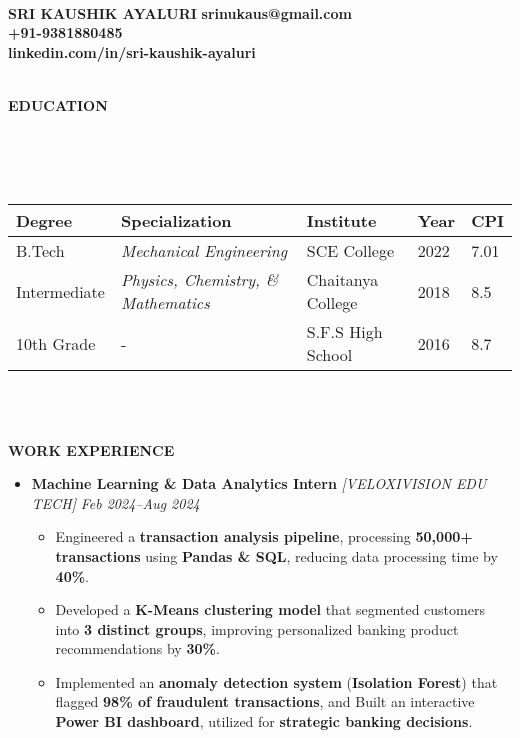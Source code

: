 \documentclass[a4paper,10pt]{article}
\newcommand{\lsep}{-0.5cm}
\newcommand{\resheading}[1]{%
  \par\noindent%
  \small%
  \colorbox{mygrey}{%
    \parbox{\dimexpr\linewidth-2\fboxsep\relax}{%
      \textbf{#1}%
    }%
  }%
  \par\nobreak%
}
\begin{document}
\hspace{0.5cm}\\[-1.8cm]

\textbf{SRI KAUSHIK AYALURI} \hspace{9.6cm} {\bf srinukaus@gmail.com}\\
  \hspace{10.3 cm} {\bf +91-9381880485} \\
  \hspace{7.9 cm} {\bf linkedin.com/in/sri-kaushik-ayaluri} \\
 \\

\vspace{-2mm}
\resheading{\textbf{EDUCATION} }\\[\lsep]\\ \\
\indent \begin{tabular}{ p{2.5cm} @{\hskip 0.15in} p{5.5cm} @{\hskip 0.15in} p{3.5cm} @{\hskip 0.15in} p{2.5cm} @{\hskip 0.15in} p{1.5cm} }
\toprule
\textbf{Degree} & \textbf{Specialization} & \textbf{Institute} & \textbf{Year} & \textbf{CPI} \\
\midrule
B.Tech & \textit{Mechanical Engineering} & SCE College & 2022 & 7.01 \\
Intermediate & \textit{Physics, Chemistry, \& Mathematics} & Chaitanya College & 2018 & 8.5 \\
10th Grade & - & S.F.S High School & 2016 & 8.7 \\
\bottomrule
\end{tabular}

\\ \\

\vspace{1mm}
\resheading{\textbf{WORK EXPERIENCE} }

\begin{itemize}
\vspace{-1mm}
\item {\bf Machine Learning \& Data Analytics Intern } \textit{[VELOXIVISION EDU TECH]}
\textit{\hfill {Feb 2024–Aug 2024}}
\vspace{-1mm}
\begin{itemize}
\item Engineered a \textbf{transaction analysis pipeline}, processing \textbf{50,000+ transactions} using \textbf{Pandas \& SQL}, reducing data processing time by \textbf{40\%}.
\item Developed a \textbf{K-Means clustering model} that segmented customers into \textbf{3 distinct groups}, improving personalized banking product recommendations by \textbf{30\%}.
\item Implemented an \textbf{anomaly detection system} (\textbf{Isolation Forest}) that flagged \textbf{98\% of fraudulent transactions}, and Built an interactive \textbf{Power BI dashboard}, utilized for \textbf{strategic banking decisions}.
\vspace{-1mm}
\end{itemize}
\end{itemize}
\end{document}
